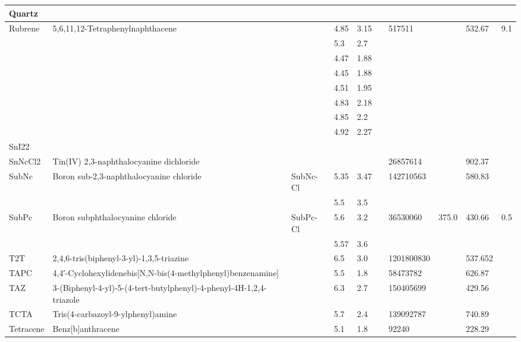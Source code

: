 \documentclass{article}
\begin{document}
\begin{landscape}
\begin{longtable}{| p{} | p{} | p{} | p{} | p{} | p{} | p{} | p{} | p{} | p{} | }
 \hline 
Quartz &  &  &  &  &  &  &  &  &  \\ 
 
 \hline 
Rubrene & 5,6,11,12-Tetraphenylnaphthacene &  & 4.85 & 3.15 &  & 517511 &  & 532.67 & 9.1 \\ 
 & &  & 5.3 & 2.7 &  &  & & & \\ 
 & &  & 4.47 & 1.88 &  &  & & & \\ 
 & &  & 4.45 & 1.88 &  &  & & & \\ 
 & &  & 4.51 & 1.95 &  &  & & & \\ 
 & &  & 4.83 & 2.18 &  &  & & & \\ 
 & &  & 4.85 & 2.2 &  &  & & & \\ 
 & &  & 4.92 & 2.27 &  &  & & & \\ 
 
 \hline 
SnI22 &  &  &  &  &  &  &  &  &  \\ 
 
 \hline 
SnNcCl2 & Tin(IV) 2,3-naphthalocyanine dichloride &  &  &  &  & 26857614 &  & 902.37 &  \\ 
 
 \hline 
SubNc & Boron sub-2,3-naphthalocyanine chloride & SubNc-Cl & 5.35 & 3.47 &  & 142710563 &  & 580.83 &  \\ 
 & &  & 5.5 & 3.5 &  &  & & & \\ 
 
 \hline 
SubPc & Boron subphthalocyanine chloride & SubPc-Cl & 5.6 & 3.2 &  & 36530060 & 375.0 & 430.66 & 0.5 \\ 
 & &  & 5.57 & 3.6 &  &  & & & \\ 
 
 \hline 
T2T & 2,4,6-tris(biphenyl-3-yl)-1,3,5-triazine &  & 6.5 & 3.0 &  & 1201800830 &  & 537.652 &  \\ 
 
 \hline 
TAPC & 4,4′-Cyclohexylidenebis[N,N-bis(4-methylphenyl)benzenamine] &  & 5.5 & 1.8 &  & 58473782 &  & 626.87 &  \\ 
 
 \hline 
TAZ & 3-(Biphenyl-4-yl)-5-(4-tert-butylphenyl)-4-phenyl-4H-1,2,4-triazole &  & 6.3 & 2.7 &  & 150405699 &  & 429.56 &  \\ 
 
 \hline 
TCTA & Tris(4-carbazoyl-9-ylphenyl)amine &  & 5.7 & 2.4 &  & 139092787 &  & 740.89 &  \\ 
 
 \hline 
Tetracene & Benz[b]anthracene &  & 5.1 & 1.8 &  & 92240 &  & 228.29 &  \\ 
 

\end{longtable}
\end{landscape}
\end{document}
